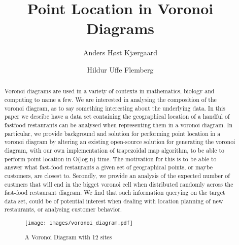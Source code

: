 \documentclass[oribibl]{llncs}
\begin{document}

\mainmatter              %
\title{Point Location in Voronoi Diagrams}

\author{Anders Høst Kjærgaard \and Hildur Uffe Flemberg\\
}



\maketitle              %

\begin{abstract}
Voronoi diagrams are used in a variety of contexts in mathematics, biology and computing to name a few. We are interested in analysing the composition of the voronoi diagram, as to say something interesting about the underlying data. In this paper we descibe have a data set containing the geographical location of a handful of fastfood restaurants can be analysed when representing them in a voronoi diagram. In particular, we provide background and solution for performing point location in a voronoi diagram by altering an existing open-source solution for generating the voronoi diagram, with our own implementation of trapezoidal map algorithm, to be able to perform point location in O(log n) time. The motivation for this is to be able to answer what fast-food restaurants a given set of geographical points, or maybe customers, are closest to. Secondly, we provide an analysis of the expected number of custmers that will end in the bigget voronoi cell when distributed randomly across the fast-food restaurant diagram. We find that such information querying on the target data set, could be of potential interest when dealing with location planning of new restaurants, or analysing customer behavior.

\begin{figure}[t]
    \centering
        \texttt{[image: images/voronoi\_diagram.pdf]}
    \caption{A Voronoi Diagram with 12 sites}
    \label{fig:Pipes2IFCWorkflow}
\end{figure}


\end{abstract}











\end{document}
